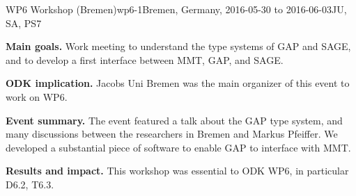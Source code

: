 \begin{event}{WP6 Workshop (Bremen)}{wp6-1}{Bremen, Germany, 2016-05-30 to 2016-06-03}{JU, SA, PS}{7}{}

\textbf{Main goals.} Work meeting to understand the type systems of GAP and
SAGE, and to develop a first interface between MMT, GAP, and SAGE.

\textbf{ODK implication.} Jacobs Uni Bremen was the main organizer of this
event to work on WP6.

\textbf{Event summary.} The event featured a talk about the GAP type system, and
many discussions between the researchers in Bremen and Markus Pfeiffer. We
developed a substantial piece of software to enable GAP to interface with MMT.

\textbf{Results and impact.} 
This workshop was essential to ODK WP6, in particular D6.2, T6.3.

\end{event}